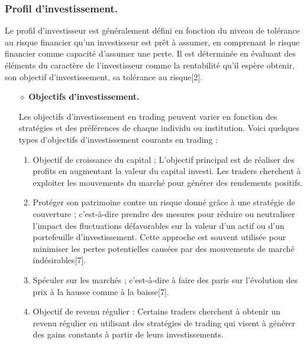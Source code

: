 \subsubsection{Profil d'investissement.}
\par{
Le profil d'investisseur est généralement défini en fonction du niveau de tolérance au risque financier 
qu'un investisseur est prêt à assumer, en comprenant le risque financier comme capacité d'assumer une 
perte. Il est déterminée en évaluant des éléments du caractère de l'investisseur comme la rentabilité 
qu'il espère obtenir, son objectif d'investissement, sa tolérance au risque[2].}



\begin{itemize}
\item[$\diamond$]\textbf{Objectifs d'investissement.}
\par{
Les objectifs d'investissement en trading peuvent varier en fonction des stratégies et 
des préférences de chaque individu ou institution. Voici quelques 
types d'objectifs d'investissement courants en trading :}
\begin{enumerate}
	\item Objectif de croissance du capital ;
	L'objectif principal est de réaliser des profits en augmentant la valeur du 
	capital investi. Les traders cherchent à exploiter les mouvements du marché 
	pour générer des rendements positifs.

	\item Protéger son patrimoine contre un risque donné grâce à une stratégie de couverture ; 
	c'est-à-dire prendre des mesures pour réduire ou neutraliser l'impact des fluctuations 
	défavorables sur la valeur d'un actif ou d'un portefeuille d'investissement. Cette 
	approche est souvent utilisée pour minimiser les pertes potentielles causées par des 
	mouvements de marché indésirables[7].
	
	\item Spéculer sur les marchés ;  
	c'est-à-dire à faire des paris sur l'évolution des prix à la hausse comme à la 
	baisse[7].

	\item Objectif de revenu régulier : Certains traders cherchent à obtenir un revenu 
	régulier en utilisant des stratégies de trading qui visent à générer des gains 
	constants à partir de leurs investissements.

\end{enumerate}


\end{itemize}
